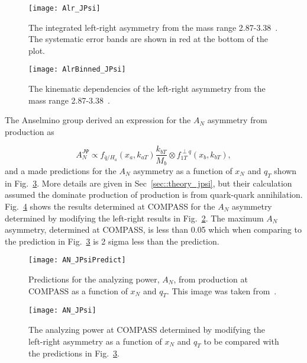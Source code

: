 \begin{figure}[h!t]
  \centering
  \texttt{[image: Alr\_JPsi]}
  \caption{The integrated left-right asymmetry from the mass range
    2.87-3.38~{\gvcw}.  The systematic error bands are shown in red at the
    bottom of the plot.}
  \label{fig::Alr_JPsi}
\end{figure}

\begin{figure}[h!t]
  \centering \texttt{[image: AlrBinned\_JPsi]}
  \caption{The kinematic dependencies of the left-right asymmetry from the mass
    range 2.87-3.38~{\gvcw}.}
  \label{fig::AlrBinned_JPsi}
\end{figure}

The Anselmino group derived an expression for the $A_N$ asymmetry from {\jp}
production as~\cite{Anselmino:2016fhz}

\begin{equation}
  A^{J\Psi}_{N} \propto f_{\bar{q}/H_a}(x_a, k_{aT})
  \frac{k_{bT}}{M_b} \otimes f_{1T}^{\perp q}(x_b, k_{bT}),
\end{equation}
\noindent
and a made predictions for the $A_N$ asymmetry as a function of $x_N$ and
$q_T$ shown in Fig.~\ref{fig::AN_JPsiPredict}.  More details are given in
Sec~\ref{sec::theory_jpsi}, but their calculation assumed the dominate
production of {\jp} production is from quark-quark annihilation.
Fig.~\ref{fig::AN_JPsi} shows the results determined at COMPASS for the $A_N$
asymmetry determined by modifying the left-right results in
Fig.~\ref{fig::AlrBinned_JPsi}.  The maximum $A_N$ asymmetry, determined at
COMPASS, is less than 0.05 which when comparing to the prediction in
Fig.~\ref{fig::AN_JPsiPredict} is 2 sigma less than the prediction.  

\begin{figure}[h!t]
  \centering \texttt{[image: AN\_JPsiPredict]}
  \caption{Predictions for the analyzing power, $A_N$, from {\jp} production at
    COMPASS as a function of $x_N$ and $q_T$.  This image was taken
    from~\cite{Anselmino:2016fhz}.}
  \label{fig::AN_JPsiPredict}
\end{figure}

\begin{figure}[h!t]
  \centering \texttt{[image: AN\_JPsi]}
  \caption{The analyzing power at COMPASS determined by modifying the left-right
    asymmetry as a function of $x_N$ and $q_T$ to be compared with the
    predictions in Fig.~\ref{fig::AN_JPsiPredict}. }
  \label{fig::AN_JPsi}
\end{figure}

